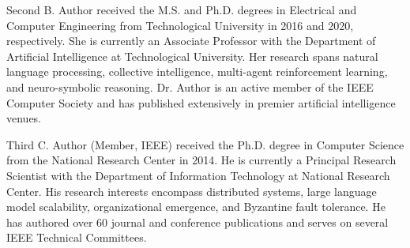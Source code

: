 \documentclass{ieeeaccess}
\begin{document}
\begin{IEEEbiographynophoto}{Second B. Author}
received the M.S. and Ph.D. degrees in Electrical and Computer Engineering from Technological University in 2016 and 2020, respectively. She is currently an Associate Professor with the Department of Artificial Intelligence at Technological University. Her research spans natural language processing, collective intelligence, multi-agent reinforcement learning, and neuro-symbolic reasoning. Dr. Author is an active member of the IEEE Computer Society and has published extensively in premier artificial intelligence venues.
\end{IEEEbiographynophoto}

\begin{IEEEbiographynophoto}{Third C. Author}
(Member, IEEE) received the Ph.D. degree in Computer Science from the National Research Center in 2014. He is currently a Principal Research Scientist with the Department of Information Technology at National Research Center. His research interests encompass distributed systems, large language model scalability, organizational emergence, and Byzantine fault tolerance. He has authored over 60 journal and conference publications and serves on several IEEE Technical Committees.
\end{IEEEbiographynophoto}

\EOD
\end{document}
